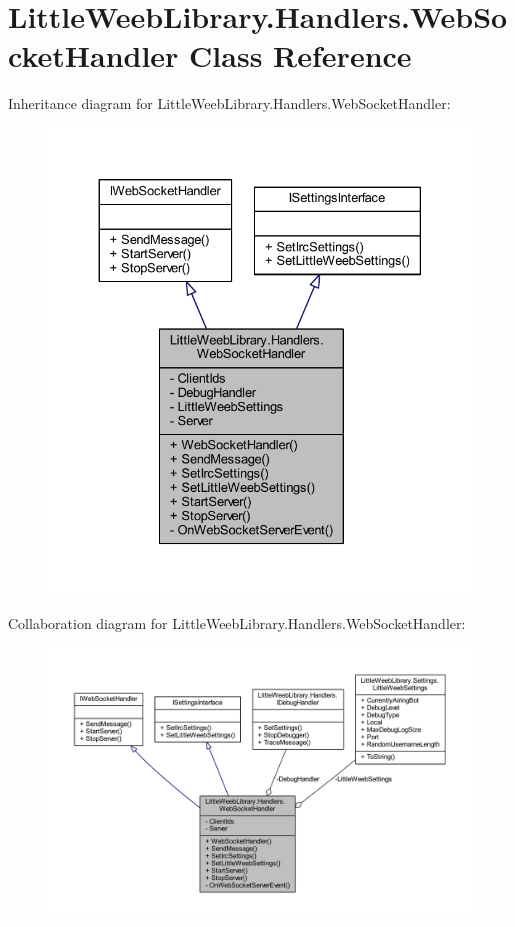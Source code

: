 \hypertarget{class_little_weeb_library_1_1_handlers_1_1_web_socket_handler}{}\section{Little\+Weeb\+Library.\+Handlers.\+Web\+Socket\+Handler Class Reference}
\label{class_little_weeb_library_1_1_handlers_1_1_web_socket_handler}


Inheritance diagram for Little\+Weeb\+Library.\+Handlers.\+Web\+Socket\+Handler\+:\nopagebreak
\begin{figure}[H]
\begin{center}
\leavevmode
\includegraphics[width=330pt]{class_little_weeb_library_1_1_handlers_1_1_web_socket_handler__inherit__graph}
\end{center}
\end{figure}


Collaboration diagram for Little\+Weeb\+Library.\+Handlers.\+Web\+Socket\+Handler\+:\nopagebreak
\begin{figure}[H]
\begin{center}
\leavevmode
\includegraphics[width=350pt]{class_little_weeb_library_1_1_handlers_1_1_web_socket_handler__coll__graph}
\end{center}
\end{figure}
